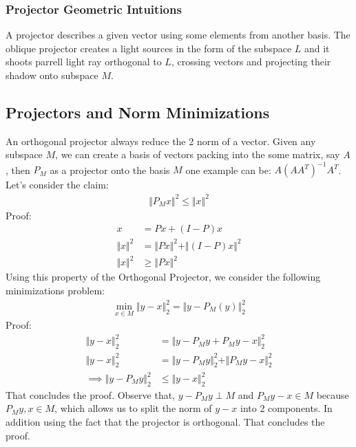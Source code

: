 \documentclass[]{article}
\theoremstyle{definition}
\begin{document}
            \subsubsection{Projector Geometric Intuitions}
                A projector describes a given vector using some elements from another basis. The oblique projector creates a light sources in the form of the subspace $L$ and it shoots parrell light ray orthogonal to $L$, crossing vectors and projecting their shadow onto subspace $M$. 
    \subsection{Projectors and Norm Minimizations}
        An orthogonal projector always reduce the 2 norm of a vector. Given any subspace $M$, we can create a basis of vectors packing into the some matrix, say $A$, then $P_M$ as a projector onto the basis $M$ one example can be: $A(AA^T)^{-1}A^T$. Let's consider the claim: 
        \begin{align}
            \Vert P_Mx\Vert^2 \le \Vert x\Vert^2
        \end{align}
        Proof: 
        \begin{align}
            x &= Px + (I - P)x 
            \\
            \Vert x\Vert^2 &= \Vert Px\Vert^2 + \Vert (I - P)x\Vert^2
            \\
            \Vert x\Vert^2 &\ge \Vert Px\Vert^2
        \end{align}
        Using this property of the Orthogonal Projector, we consider the following minimizations problem: 
        \begin{align}
            \min_{x\in M} \Vert y - x\Vert_2^2 = \Vert y - P_M(y)\Vert_2^2
        \end{align}
        Proof:
        \begin{align}
            \Vert y - x\Vert_2^2 &= 
            \Vert y - P_My + P_My - x\Vert_2^2
            \\
            \Vert y - x\Vert_2^2 &= 
            \Vert y - P_My\Vert_2^2 + \Vert P_My - x\Vert_2^2
            \\
            \implies 
            \Vert y - P_My\Vert_2^2 &\le \Vert y - x\Vert_2^2
        \end{align}
        That concludes the proof. Observe that, $y - P_My\perp M$ and $P_My - x \in M$ because $P_My, x \in M$, which allows us to split the norm of $y - x$ into 2 components. In addition using the fact that the projector is orthogonal. That concludes the proof. 
\end{document}
